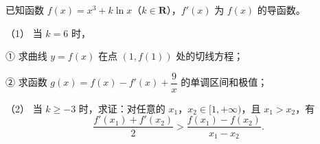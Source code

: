 \begin{question}
已知函数 $f(x)=x^3+k\ln x$（$k\in\mathbf R$），$f'(x)$ 为 $f(x)$ 的导函数。

（1） 当 $k=6$ 时，

① 求曲线 $y=f(x)$ 在点 $(1,f(1))$ 处的切线方程；

② 求函数 $g(x)=f(x)-f'(x)+\dfrac9x$ 的单调区间和极值；

（2） 当 $k\geqslant-3$ 时，求证：对任意的 $x_1$，$x_2\in[1,+\infty)$，且 $x_1>x_2$，有
\nopagebreak[4]
\[\frac{f'(x_1)+f'(x_2)}{2}>\frac{f(x_1)-f(x_2)}{x_1-x_2}.\]

\end{question}